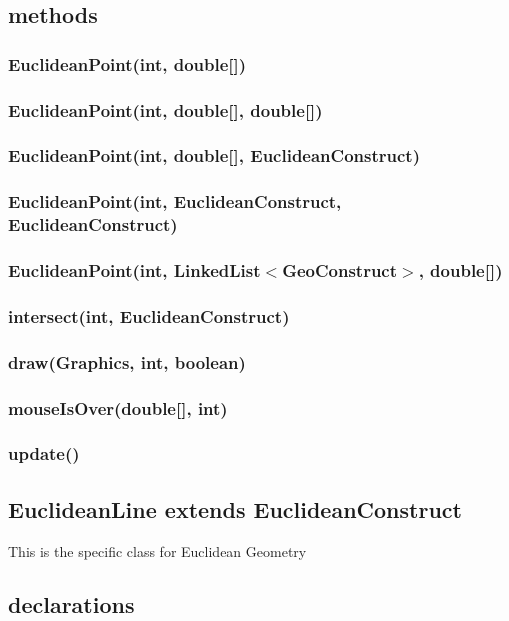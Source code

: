 \documentclass[a4paper,10pt]{report}
\begin{document}
\subsubsection{}
\subsection{methods}
\subsubsection{EuclideanPoint(int, double[])}
\subsubsection{EuclideanPoint(int, double[], double[])}
\subsubsection{EuclideanPoint(int, double[], EuclideanConstruct)}
\subsubsection{EuclideanPoint(int, EuclideanConstruct, EuclideanConstruct)}
\subsubsection{EuclideanPoint(int, LinkedList$<$GeoConstruct$>$, double[])}
\subsubsection{intersect(int, EuclideanConstruct)}
\subsubsection{draw(Graphics, int, boolean)}
\subsubsection{mouseIsOver(double[], int)}
\subsubsection{update()}
\subsection{EuclideanLine extends EuclideanConstruct} This is the specific class for Euclidean Geometry
\subsection{declarations}
\end{document}
